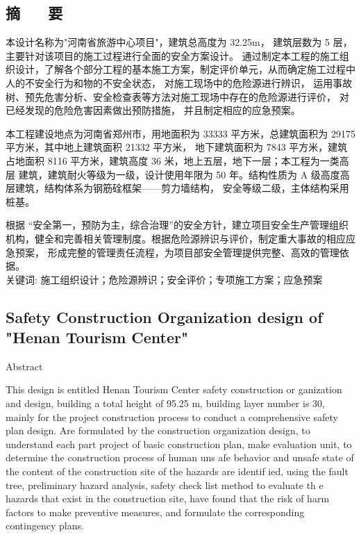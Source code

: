 \begin{center}
\section*{  \textbf{摘 ~~ 要}}
\end{center}

\vskip0.5cm
本设计名称为"河南省旅游中心项目"，建筑总高度为 32.25m， 建筑层数为 5  层，主要针对该项目的施工过程进行全面的安全方案设计。
通过制定本工程的施工组织设计，了解各个部分工程的基本施工方案，制定评价单元，从而确定施工过程中人的不安全行为和物的不安全状态，
对施工现场中的危险源进行辨识， 运用事故树、预先危害分析、安全检查表等方法对施工现场中存在的危险源进行评价， 对已经发现的危险危害因素做出预防措施，
并且制定相应的应急预案。

本工程建设地点为河南省郑州市，用地面积为 33333 平方米，总建筑面积为 29175 平方米，其中地上建筑面积 21332 平方米，
地下建筑面积为 7843 平方米，建筑占地面积 8116 平方米，建筑高度 36 米，地上五层，地下一层；本工程为一类高层
建筑，建筑耐火等级为一级，设计使用年限为 50 年。结构性质为 A 级高度高层建筑，结构体系为钢筋硂框架——剪力墙结构，
安全等级二级，主体结构采用桩基。

根据 “安全第一，预防为主，综合治理”的安全方针，建立项目安全生产管理组织机构，健全和完善相关管理制度。根据危险源辨识与评价，制定重大事故的相应应急预案，
形成完整的管理责任流程，为项目部安全管理提供完整、高效的管理依据。\\



{ \heiti 关键词: 施工组织设计；危险源辨识；安全评价；专项施工方案；应急预案}
\pagestyle{fancy}

\clearpage
\begin{center}
    \section*{  \textbf{Safety Construction Organization design of "Henan Tourism Center"}}
     Abstract
    \end{center}


   This design is entitled Henan Tourism Center safety construction or ganization and design, building a total height of 95.25 m, building layer number is 30, 
   mainly for the project construction process to conduct a comprehensive safety plan design. Are formulated by the construction organization design, 
   to understand each part project of basic construction plan, make evaluation unit, to determine the construction process of human uns afe behavior 
   and unsafe state of the content of the construction site of the hazards are identif ied, using the fault tree, preliminary hazard analysis, safety 
   check list method to evaluate th e hazards that exist in the construction site, have found that the risk of harm factors to make preventive measures,
    and formulate the corresponding contingency plans.

